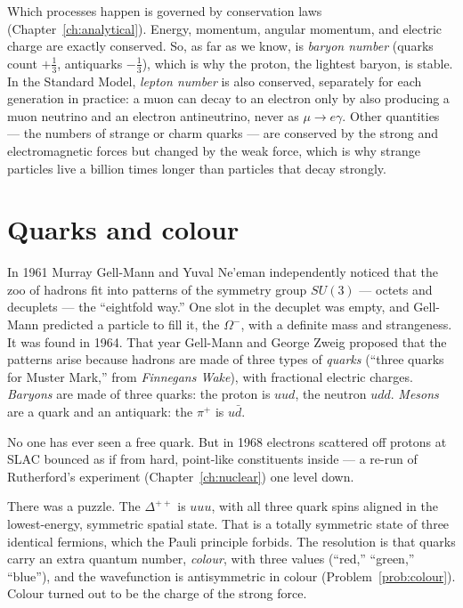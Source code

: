 Which processes happen is governed by conservation laws (Chapter~\ref{ch:analytical}). Energy, momentum, angular momentum, and electric charge are exactly conserved. So, as far as we know, is \emph{baryon number} (quarks count $+\tfrac13$, antiquarks $-\tfrac13$), which is why the proton, the lightest baryon, is stable. In the Standard Model, \emph{lepton number} is also conserved, separately for each generation in practice: a muon can decay to an electron only by also producing a muon neutrino and an electron antineutrino, never as $\mu\to e\gamma$. Other quantities --- the numbers of strange or charm quarks --- are conserved by the strong and electromagnetic forces but changed by the weak force, which is why strange particles live a billion times longer than particles that decay strongly.

\section{Quarks and colour}

In 1961 Murray Gell-Mann and Yuval Ne'eman independently noticed that the zoo of hadrons fit into patterns of the symmetry group $SU(3)$ --- octets and decuplets --- the ``eightfold way.'' One slot in the decuplet was empty, and Gell-Mann predicted a particle to fill it, the $\Omega^-$, with a definite mass and strangeness. It was found in 1964. That year Gell-Mann and George Zweig proposed that the patterns arise because hadrons are made of three types of \emph{quarks} (``three quarks for Muster Mark,'' from \emph{Finnegans Wake}), with fractional electric charges. \emph{Baryons} are made of three quarks: the proton is $uud$, the neutron $udd$. \emph{Mesons} are a quark and an antiquark: the $\pi^+$ is $u\bar d$.

No one has ever seen a free quark. But in 1968 electrons scattered off protons at SLAC bounced as if from hard, point-like constituents inside --- a re-run of Rutherford's experiment (Chapter~\ref{ch:nuclear}) one level down.

There was a puzzle. The $\Delta^{++}$ is $uuu$, with all three quark spins aligned in the lowest-energy, symmetric spatial state. That is a totally symmetric state of three identical fermions, which the Pauli principle forbids. The resolution is that quarks carry an extra quantum number, \emph{colour}, with three values (``red,'' ``green,'' ``blue''), and the wavefunction is antisymmetric in colour (Problem~\ref{prob:colour}). Colour turned out to be the charge of the strong force.

